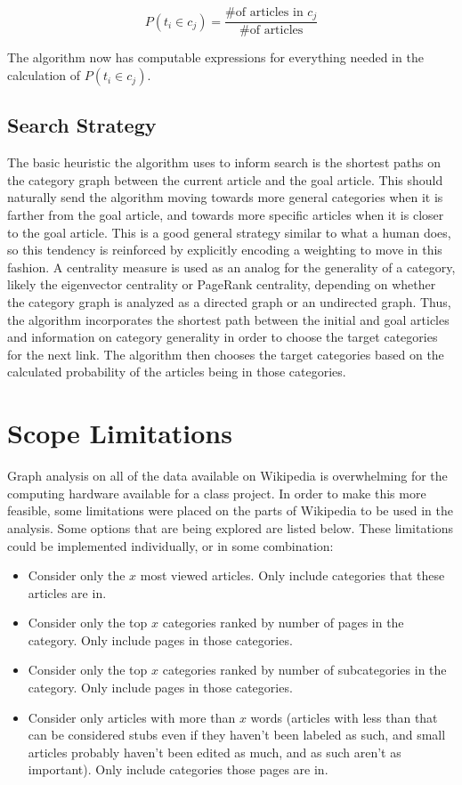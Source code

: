 \documentclass{article}
\begin{document}
\[P(t_i \in c_j) = \frac{\text{\# of articles in } c_j}{\text{\# of articles}}\]

The algorithm now has computable expressions for everything needed in the
calculation of $P(t_i \in c_j)$. 

\subsection{Search Strategy}
The basic heuristic the algorithm uses to inform search is the shortest paths on
the category graph between the current article and the goal article. This should
naturally send the algorithm moving towards more general categories when it is
farther from the goal article, and towards more specific articles when it is
closer to the goal article. This is a good general strategy similar to what a
human does, so this tendency is reinforced by explicitly encoding a weighting to
move in this fashion. A centrality measure is used as an analog for the
generality of a category, likely the eigenvector centrality or PageRank
centrality, depending on whether the category graph is analyzed as a directed
graph or an undirected graph. Thus, the algorithm incorporates the shortest path
between the initial and goal articles and information on category generality in
order to choose the target categories for the next link.  The algorithm then
chooses the target categories based on the calculated probability of the
articles being in those categories.

\section{Scope Limitations}
Graph analysis on all of the data available on Wikipedia is overwhelming for the
computing hardware available for a class project. In order to make this more
feasible, some limitations were placed on the parts of Wikipedia to be used in
the analysis. Some options that are being explored are listed below. These
limitations could be implemented individually, or in some combination:

\begin{itemize}
\item Consider only the $x$ most viewed articles. Only include categories that
  these articles are in.

\item Consider only the top $x$ categories ranked by number of pages in the
  category. Only include pages in those categories.

\item Consider only the top $x$ categories ranked by number of subcategories in the
  category. Only include pages in those categories.

\item Consider only articles with more than $x$ words (articles with less than
  that can be considered stubs even if they haven't been labeled as such, and
  small articles probably haven't been edited as much, and as such aren't as
  important). Only include categories those pages are in.
\end{itemize}
\end{document}
